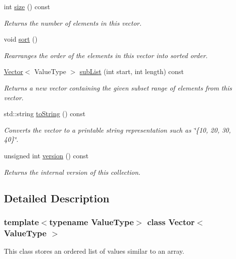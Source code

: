 \begin{DoxyCompactItemize}
int \mbox{\hyperlink{classVector_af9593d4a5ff4274efaf429cb4f9e57cc}{size}} () const
\begin{DoxyCompactList}\small\item\em Returns the number of elements in this vector. \end{DoxyCompactList}\item 
void \mbox{\hyperlink{classVector_a47fdc9eea42b6975cdc835bb2e08810e}{sort}} ()
\begin{DoxyCompactList}\small\item\em Rearranges the order of the elements in this vector into sorted order. \end{DoxyCompactList}\item 
\mbox{\hyperlink{classVector}{Vector}}$<$ Value\+Type $>$ \mbox{\hyperlink{classVector_a68d5113d5e35ad7906cb7d1707621e08}{sub\+List}} (int start, int length) const
\begin{DoxyCompactList}\small\item\em Returns a new vector containing the given subset range of elements from this vector. \end{DoxyCompactList}\item 
std\+::string \mbox{\hyperlink{classVector_a1fe5121d6528fdea3f243321b3fa3a49}{to\+String}} () const
\begin{DoxyCompactList}\small\item\em Converts the vector to a printable string representation such as \char`\"{}\{10, 20, 30, 40\}\char`\"{}. \end{DoxyCompactList}\item 
unsigned int \mbox{\hyperlink{classVector_a0aa696ccb72cbf928535d6b646bac1aa}{version}} () const
\begin{DoxyCompactList}\small\item\em Returns the internal version of this collection. \end{DoxyCompactList}\end{DoxyCompactItemize}


\subsection{Detailed Description}
\subsubsection*{template$<$typename Value\+Type$>$\newline
class Vector$<$ Value\+Type $>$}

This class stores an ordered list of values similar to an array. 

